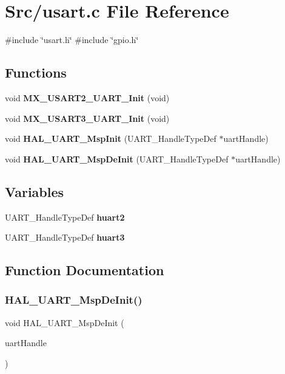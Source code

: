 \section{Src/usart.c File Reference}
\label{usart_8c}
{\ttfamily \#include \char`\"{}usart.\+h\char`\"{}}\newline
{\ttfamily \#include \char`\"{}gpio.\+h\char`\"{}}\newline
\subsection*{Functions}
\begin{DoxyCompactItemize}
\item 
void \textbf{ M\+X\+\_\+\+U\+S\+A\+R\+T2\+\_\+\+U\+A\+R\+T\+\_\+\+Init} (void)
\item 
void \textbf{ M\+X\+\_\+\+U\+S\+A\+R\+T3\+\_\+\+U\+A\+R\+T\+\_\+\+Init} (void)
\item 
void \textbf{ H\+A\+L\+\_\+\+U\+A\+R\+T\+\_\+\+Msp\+Init} (U\+A\+R\+T\+\_\+\+Handle\+Type\+Def $\ast$uart\+Handle)
\item 
void \textbf{ H\+A\+L\+\_\+\+U\+A\+R\+T\+\_\+\+Msp\+De\+Init} (U\+A\+R\+T\+\_\+\+Handle\+Type\+Def $\ast$uart\+Handle)
\end{DoxyCompactItemize}
\subsection*{Variables}
\begin{DoxyCompactItemize}
\item 
U\+A\+R\+T\+\_\+\+Handle\+Type\+Def \textbf{ huart2}
\item 
U\+A\+R\+T\+\_\+\+Handle\+Type\+Def \textbf{ huart3}
\end{DoxyCompactItemize}


\subsection{Function Documentation}
\mbox{\label{usart_8c_a94cd2c58add4f2549895a03bf267622e}} 
\subsubsection{H\+A\+L\+\_\+\+U\+A\+R\+T\+\_\+\+Msp\+De\+Init()}
{\footnotesize\ttfamily void H\+A\+L\+\_\+\+U\+A\+R\+T\+\_\+\+Msp\+De\+Init (\begin{DoxyParamCaption}\item[{U\+A\+R\+T\+\_\+\+Handle\+Type\+Def $\ast$}]{uart\+Handle }\end{DoxyParamCaption})}


